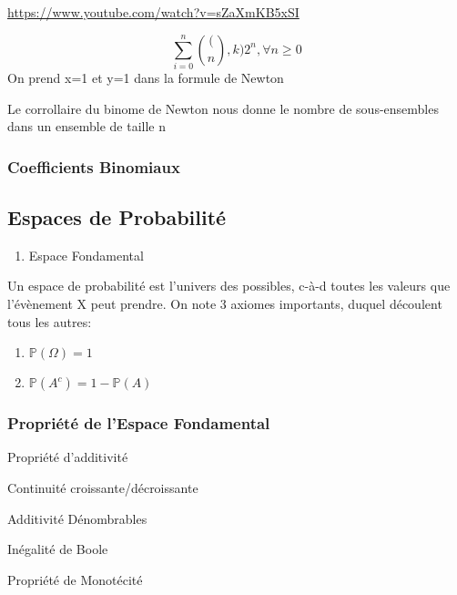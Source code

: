 \documentclass{article}
\begin{document}
\url{https://www.youtube.com/watch?v=sZaXmKB5xSI}

\begin{corrollary}
    $$ \sum^{n}_{i=0} \binom(n,k) 2^n , \forall n \geq 0$$
    On prend x=1 et y=1 dans la formule de Newton
\end{corrollary}

\begin{remark}
    Le corrollaire du binome de Newton nous donne le nombre de sous-ensembles
    dans un ensemble de taille n
\end{remark}


\subsubsection{Coefficients Binomiaux}

\subsection{Espaces de Probabilité}

\begin{enumerate}
    \item Espace Fondamental
\end{enumerate}

Un espace de probabilité est l'univers des possibles, c-à-d toutes les
valeurs que l'évènement X peut prendre. On note 3 axiomes importants, duquel
découlent tous les autres:

\begin{enumerate}
    \item $ \mathbb{P} (\Omega) = 1 $
    \item $ \mathbb{P} (A^c) = 1  - \mathbb{P}(A)$
\end{enumerate}

\subsubsection{Propriété de l'Espace Fondamental}%
\label{ssub:Propriété de l'Espace Fondamental}


\begin{property}
    \item Propriété d'additivité
    \item Continuité croissante/décroissante
    \item Additivité Dénombrables
    \item Inégalité de Boole
    \item Propriété de Monotécité
\end{property}
\end{document}
